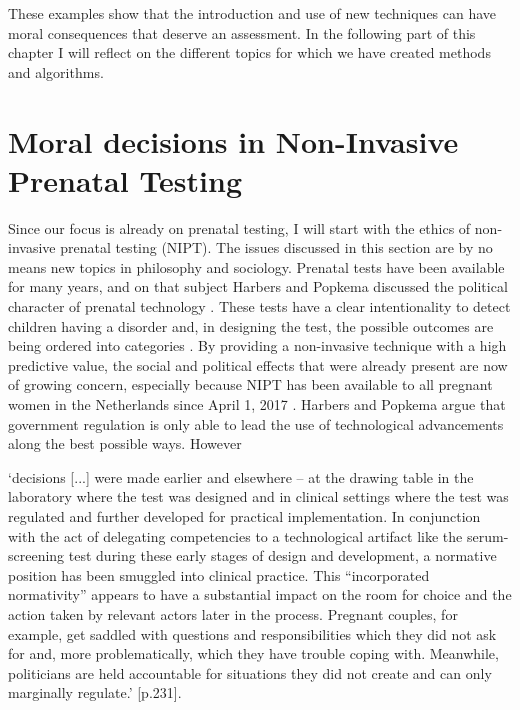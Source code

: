 These examples show that the introduction and use of new techniques can have moral consequences that deserve an assessment. 
In the following part of this chapter I will reflect on the different topics for which we have created methods and algorithms. 

\section{Moral decisions in Non-Invasive Prenatal \newline Testing}             
Since our focus is already on prenatal testing, I will start with the ethics of non-invasive prenatal testing (NIPT). 
The issues discussed in this section are by no means new topics in philosophy and sociology. 
Prenatal tests have been available for many years, and on that subject Harbers and Popkema discussed the political character of prenatal technology \cite{Harbers_2005}. 
These tests have a clear intentionality to detect children having a disorder and, in designing the test, the possible outcomes are being ordered into categories \cite{Stephenson_2017}. 
By providing a non-invasive technique with a high predictive value, the social and political effects that were already present are now of growing concern, especially because NIPT has been available to all pregnant women in the Netherlands since April 1, 2017 \cite{niptconsortium_2017a}. 
Harbers and Popkema argue that government regulation is only able to lead the use of technological advancements along the best possible ways. 
However \newline 

\hfill\begin{minipage}{\dimexpr\textwidth-1cm}
‘decisions [...] were made earlier and elsewhere – at the drawing table in the laboratory where the test was designed and in clinical settings where the test was regulated and further developed for practical implementation. 
In conjunction with the act of delegating competencies to a technological artifact like the serum-screening test during these early stages of design and development, a normative position has been smuggled into clinical practice.
This “incorporated normativity” appears to have a substantial impact on the room for choice and the action taken by relevant actors later in the process.
Pregnant couples, for example, get saddled with questions and responsibilities which they did not ask for and, more problematically, which they have trouble coping with.  
Meanwhile, politicians are held accountable for situations they did not create and can only marginally regulate.’ \cite{Harbers_2005}[p.231].
\end{minipage} \newline \newline


